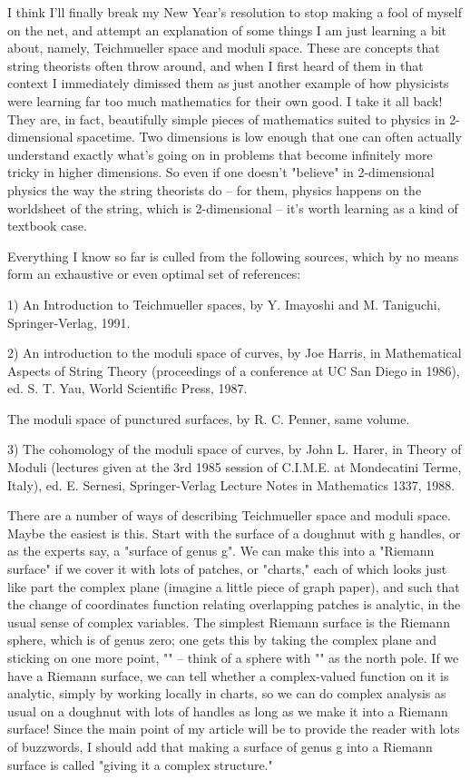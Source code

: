 

I think I'll finally break my New Year's resolution to stop making a fool
of myself on the net, and attempt an explanation of some things I am
just learning a bit about, namely, Teichmueller space and moduli space.
These are concepts that string theorists often throw around, and when I first
heard of them in that context I immediately dimissed them as just
another example of how physicists were learning far too much
mathematics for their own good.  I take it all back!  They are, in fact,
beautifully simple pieces of mathematics suited to physics in
2-dimensional spacetime.  Two dimensions is low enough that one can
often actually understand exactly what's going on in problems that
become infinitely more tricky in higher dimensions.  So even if one
doesn't "believe" in 2-dimensional physics the way the string theorists
do -- for them, physics happens on the worldsheet of the string, which is
2-dimensional -- it's worth learning as a kind of textbook case.

Everything I know so far is culled from the following sources, which by
no means form an exhaustive or even optimal set of references:

1) An Introduction to Teichmueller spaces, by Y. Imayoshi and M.
Taniguchi, Springer-Verlag, 1991.

2) An introduction to the moduli space of curves, by Joe Harris, in
Mathematical Aspects of String Theory (proceedings of a conference at UC
San Diego in 1986), ed. S. T. Yau, World Scientific Press, 1987.

The moduli space of punctured surfaces, by R. C. Penner, same volume.

3) The cohomology of the moduli space of curves, by John L. Harer, in
Theory of Moduli (lectures given at the 3rd 1985 session of C.I.M.E. at
Mondecatini Terme, Italy), ed. E. Sernesi, Springer-Verlag Lecture Notes
in Mathematics 1337, 1988.

There are a number of ways of describing Teichmueller space and moduli
space.  Maybe the easiest is this.  Start with the surface of a doughnut
with g handles, or as the experts say, a "surface of genus g".  We can
make this into a "Riemann surface" if we cover it with lots of patches,
or "charts," each of which looks just like part the complex plane
(imagine a little piece of graph paper), and such that the change of
coordinates function relating overlapping patches is analytic, in the
usual sense of complex variables.  The simplest Riemann surface is the
Riemann sphere, which is of genus zero; one gets this by taking the
complex plane and sticking on one more point, "\infty " -- think of a
sphere with "\infty " as the north pole.  If we have a Riemann surface,
we can tell whether a complex-valued function on it is analytic, simply
by working locally in charts, so we can do complex analysis as usual on
a doughnut with lots of handles as long as we make it into a Riemann
surface!  Since the main point of my article will be to provide the
reader with lots of buzzwords, I should add that making a surface of
genus g into a Riemann surface is called "giving it a complex structure."

